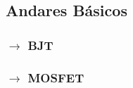 \subsection[4.1 Andares Básicos]{\hspace*{0.075 em}\raisebox{0.2 em}{$\pmb{\drsh}$} Andares Básicos}
\label{subsec:andares-basicos}

\subsubsection[4.1.1 BJT]{$\pmb{\rightarrow}$ BJT}

\subsubsection[4.1.2 MOSFET]{$\pmb{\rightarrow}$ MOSFET}

